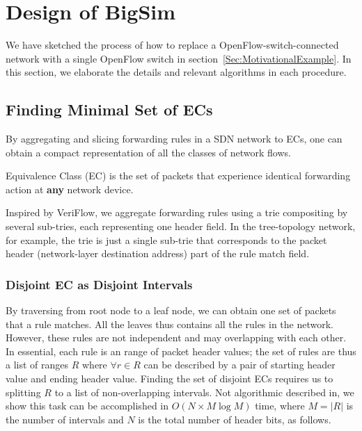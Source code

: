 \section{Design of BigSim}

We have sketched the process of how to replace a OpenFlow-switch-connected network
with a single OpenFlow switch in section~\ref{Sec:MotivationalExample}.
In this section, we elaborate the details and relevant algorithms
in each procedure.

\subsection{Finding Minimal Set of ECs}

By aggregating and slicing forwarding rules in a SDN network to ECs,
one can obtain a compact representation of all the classes of network flows.
\begin{definition}
Equivalence Class (EC) is the set of packets that
experience identical forwarding action at \textbf{any} network device.
\end{definition}
Inspired by VeriFlow\cite{Veriflow}, we aggregate forwarding rules using a trie
compositing by several sub-tries, each representing one header field.
In the tree-topology network, for example, the trie is just a single sub-trie that
corresponds to the packet header (network-layer destination address)
part of the rule match field.


\subsubsection{Disjoint EC as Disjoint Intervals}
By traversing from root node to a leaf node, we can obtain one set of packets
that a rule matches.
All the leaves thus contains all the rules in the network.
However, these rules are not independent and may overlapping with each other.
In essential, each rule is an range of packet header values;
the set of rules are thus a list of ranges $R$ where $\forall r \in R$ can be
described by a pair of starting header value and ending header value.
Finding the set of disjoint ECs requires us to splitting $R$ to
a list of non-overlapping intervals.
Not algorithmic described in\cite{Veriflow},
we show this task can be accomplished in $O(N \times M\log M)$ time,
where $M=|R|$ is the number of intervals and $N$ is the total number of header bits,
as follows\cite{SplitDisjointInterval}.

